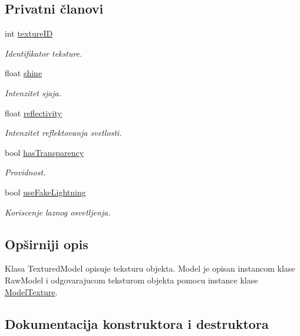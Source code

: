 \subsection*{Privatni članovi}
\begin{DoxyCompactItemize}
\item 
int \hyperlink{classtexture_1_1ModelTexture_a0dca1304604e6b705acb0460b66fce36}{texture\+ID}
\begin{DoxyCompactList}\small\item\em Identifikator teksture. \end{DoxyCompactList}\item 
float \hyperlink{classtexture_1_1ModelTexture_a7a74ed6a4d5fc91d1537fbf68e74ce03}{shine}
\begin{DoxyCompactList}\small\item\em Intenzitet sjaja. \end{DoxyCompactList}\item 
float \hyperlink{classtexture_1_1ModelTexture_a230e6f2abbfc59eae1daf72eba177b90}{reflectivity}
\begin{DoxyCompactList}\small\item\em Intenzitet reflektovanja svetlosti. \end{DoxyCompactList}\item 
bool \hyperlink{classtexture_1_1ModelTexture_add1146be92d76ac599fa032117e8b459}{has\+Transparency}
\begin{DoxyCompactList}\small\item\em Providnost. \end{DoxyCompactList}\item 
bool \hyperlink{classtexture_1_1ModelTexture_aa14650f7cc629b9f5c0ed15f82b22cad}{use\+Fake\+Lightning}
\begin{DoxyCompactList}\small\item\em Koriscenje laznog osvetljenja. \end{DoxyCompactList}\end{DoxyCompactItemize}


\subsection{Opširniji opis}
Klasa Textured\+Model opisuje teksturu objekta. Model je opisan instancom klase Raw\+Model i odgovarajucom teksturom objekta pomocu instance klase \hyperlink{classtexture_1_1ModelTexture}{Model\+Texture}. 

\subsection{Dokumentacija konstruktora i destruktora}
\mbox{\label{classtexture_1_1ModelTexture_a8a404382554b8e2625978824202c42b9}} 
